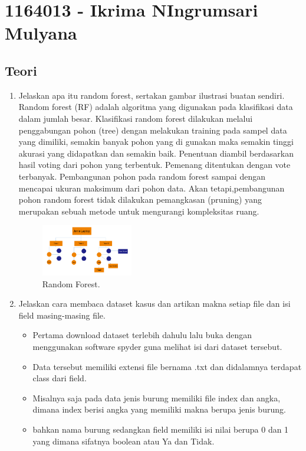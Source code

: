\section{1164013 - Ikrima NIngrumsari Mulyana}
\subsection{Teori}
\begin{enumerate}
	\item Jelaskan apa itu random forest, sertakan gambar ilustrasi buatan sendiri.
	\hfill\break
	Random forest (RF) adalah algoritma yang digunakan pada klasifikasi data dalam jumlah besar. Klasifikasi random forest dilakukan melalui penggabungan pohon (tree) dengan melakukan training pada sampel data yang dimiliki, semakin banyak pohon yang di gunakan maka semakin tinggi akurasi yang didapatkan dan semakin baik. Penentuan diambil berdasarkan hasil voting dari pohon yang terbentuk. Pemenang ditentukan dengan vote terbanyak. Pembangunan pohon pada random forest sampai dengan mencapai ukuran maksimum dari pohon data. Akan tetapi,pembangunan pohon random forest tidak dilakukan pemangkasan (pruning) yang merupakan sebuah metode untuk mengurangi kompleksitas ruang.
	\begin{figure}[H]
	\centering
		\includegraphics[width=4cm]{figures/1164013/3/1.png}
		\caption{Random Forest.}
	\end{figure}
	\item Jelaskan cara membaca dataset kasus dan artikan makna setiap file dan isi field masing-masing file.
	\hfill\break
	\begin{itemize}
		\item Pertama download dataset terlebih dahulu lalu buka dengan menggunakan software spyder guna melihat isi dari dataset tersebut.
		\item Data tersebut memiliki extensi file bernama .txt dan didalamnya terdapat class dari field.
		\item Misalnya saja pada data jenis burung memiliki file index dan angka, dimana index berisi angka yang memiliki makna berupa jenis burung.
		\item bahkan nama burung sedangkan field memiliki isi nilai berupa 0 dan 1 yang dimana sifatnya boolean atau Ya dan Tidak.

\end{itemize}
\end{enumerate}

